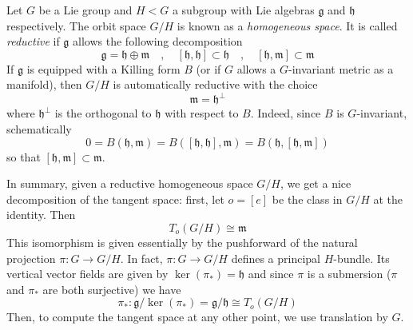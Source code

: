 \documentclass[a4paper,11pt]{article}
\theoremstyle{definition}
\newcommand{\g}{\mathfrak{g}}
\newcommand{\h}{\mathfrak{h}}
\newcommand{\m}{\mathfrak{m}}
\begin{document}
Let $G$ be a Lie group and $H < G$ a subgroup with Lie algebras $\g$ and $\h$ respectively.
The orbit space $G/H$ is known as a \emph{homogeneous space}. 
It is called \emph{reductive} if $\g$ allows the following decomposition
\begin{equation}
  \g = \h \oplus \m \quad , \quad [\h,\h] \subset \h \quad , \quad [\h,\m] \subset \m
\end{equation}
If $\g$ is equipped with a Killing form $B$ (or if $G$ allows a $G$-invariant metric as a manifold), then $G/H$ is automatically reductive with the choice 
\begin{equation}
  \m = \h^{\perp}
\end{equation}
where $\h^{\perp}$ is the orthogonal to $\h$ with respect to $B$.
Indeed, since $B$ is $G$-invariant, schematically
\begin{equation}
  0 = B(\h,\m) = B([\h,\h],\m) = B(\h,[\h,\m])
\end{equation}
so that $[\h,\m] \subset \m$.

In summary, given a reductive homogeneous space $G/H$, we get a nice decomposition of the tangent space: first, let $o = [e]$ be the class in $G/H$ at the identity.
Then 
\begin{equation}
  T_o(G/H) \cong \m
\end{equation}
This isomorphism is given essentially by the pushforward of the natural projection $\pi \colon G \to G/H$.
In fact, $\pi \colon G \to G/H$ defines a principal $H$-bundle. 
Its vertical vector fields are given by $\ker(\pi_*) = \h$ and since $\pi$ is a submersion ($\pi$ and $\pi_*$ are both surjective) we have
\begin{equation}
  \pi_* \colon \g / \ker(\pi_*) = \g / \h \cong T_o(G/H)
\end{equation}
Then, to compute the tangent space at any other point, we use translation by $G$.
\end{document}
